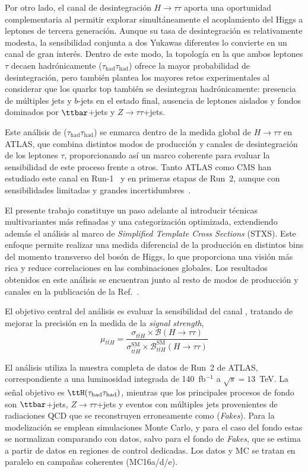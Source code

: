 Por otro lado, el canal de desintegración \(H\to\tau\tau\) aporta una oportunidad complementaria al permitir explorar simultáneamente el acoplamiento del Higgs a leptones de tercera generación. Aunque su tasa de desintegración es relativamente modesta, la sensibilidad conjunta a dos Yukawas diferentes lo convierte en un canal de gran interés. Dentro de este modo, la topología en la que ambos leptones $\tau$ decaen hadrónicamente (\(\tau_{\mathrm{had}}\tau_{\mathrm{had}}\)) ofrece la mayor probabilidad de desintegración, pero también plantea los mayores retos experimentales al considerar que los quarks top también se desintegran hadrónicamente: presencia de múltiples jets y \(b\)-jets en el estado final, ausencia de leptones aislados y fondos dominados por \(\ttbar\)+jets y \(Z\to\tau\tau\)+jets.  

Este análisis de \ttH(\(\tau_{\mathrm{had}}\tau_{\mathrm{had}}\)) se enmarca dentro de la medida global de \(H\to\tau\tau\) en ATLAS, que combina distintos modos de producción y canales de desintegración de los leptones $\tau$, proporcionando así un marco coherente para evaluar la sensibilidad de este proceso frente a otros. Tanto ATLAS como CMS han estudiado este canal en Run-1~\cite{htau_cms_atlas_2016} y en primeras etapas de Run~2, aunque con sensibilidades limitadas y grandes incertidumbres~\cite{2022, Tumasyan_2023}.  

El presente trabajo constituye un paso adelante al introducir técnicas multivariantes más refinadas y una categorización optimizada, extendiendo además el análisis al marco de \textit{Simplified Template Cross Sections} (STXS). Este enfoque permite realizar una medida diferencial de la producción en distintos bins del momento transverso del bosón de Higgs, lo que proporciona una visión más rica y reduce correlaciones en las combinaciones globales. Los resultados obtenidos en este análisis se encuentran junto al resto de modos de producción y canales en la publicación de la Ref.~\cite{differential_htautau}.

El objetivo central del análisis es evaluar la sensibilidad del canal \ttHtt, tratando de mejorar la precisión en la medida de la \textit{signal strength},  
\[
  \mu_{t\bar{t}H} = \frac{\sigma_{t\bar{t}H}\times \mathcal{B}(H \to \tau \tau)}{\sigma^{\text{SM}}_{t\bar{t}H}\times \mathcal{B}^{\text{SM}}_{t\bar{t}H}(H \to \tau \tau)}
\]  

El análisis utiliza la muestra completa de datos de Run~2 de ATLAS, correspondiente a una luminosidad integrada de 140~fb$^{-1}$ a $\sqrt{s}=13$~TeV. La señal objetivo es \(\ttH(\tau_{\mathrm{had}}\tau_{\mathrm{had}})\), mientras que los principales procesos de fondo son \(\ttbar\)+jets, $Z\to\tau\tau$+jets y eventos con múltiples jets provenientes de radiaciones QCD que se reconstruyen erroneamente como \tauhad (\textit{Fakes}). Para la modelización se emplean simulaciones Monte Carlo, y para el caso del fondo estas se normalizan comparando con datos, salvo para el fondo de \textit{Fakes}, que se estima a partir de datos en regiones de control dedicadas. Los datos y MC se tratan en paralelo en campañas coherentes (MC16a/d/e).

